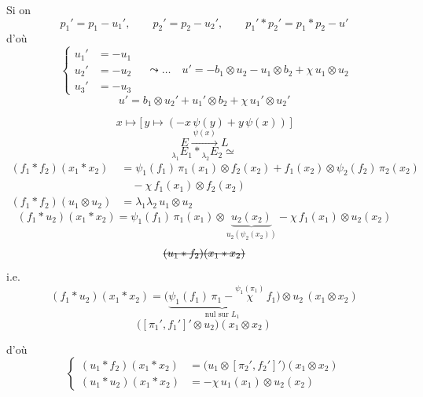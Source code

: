 \documentclass[11pt,a4paper]{article}
\begin{document}
Si on 
\[
  p_1' = p_1 - u_1', \qquad p_2' = p_2 - u_2', \qquad p_1' * p_2' = p_1 * p_2 - u'
\]
d'où
\[
  \left\{
  \begin{aligned}
    u_1' &= -u_1 \\ u_2' &= -u_2 \\ u_3' &= -u_3
  \end{aligned}
  \right.
  \quad\leadsto\ldots\quad
  u' = -b_1 \otimes u_2 - u_1 \otimes b_2 + \chi\, u_1 \otimes u_2
\]
\[
  \boxed{u' = b_1 \otimes u_2' + u_1' \otimes b_2 + \chi\, u_1' \otimes u_2'}
\]



\[
  x \longmapsto \bigl[\, y \longmapsto (-x\,\psi(y) + y\,\psi(x)) \,\bigr]
\]
\[
  E \xrightarrow{\ \psi(x)\ } L
\]
\[
  {}_{\lambda_1}E_1 * {}_{\lambda_2}E_2 \simeq
\]
\[
  \boxed{
  \begin{aligned}
    (f_1 * f_2)(x_1 * x_2) &= \psi_1(f_1)\,\pi_1(x_1) \otimes f_2(x_2)
    + f_1(x_2) \otimes \psi_2(f_2)\,\pi_2(x_2) \\
    &\quad - \chi\, f_1(x_1) \otimes f_2(x_2) \\
    (f_1 * f_2)(u_1 \otimes u_2) &= \lambda_1\lambda_2\, u_1 \otimes u_2
  \end{aligned}}
\]
\[
  (f_1 * u_2)(x_1 * x_2) = \psi_1(f_1)\,\pi_1(x_1) \otimes \underbrace{u_2(x_2)}_{u_2(\psi_2(x_2))}
  - \chi\, f_1(x_1) \otimes u_2(x_2)
\]
\[
  \text{\struck{$(u_1 * f_2)(x_1 * x_2)$}}
\]
i.e.
\[
  (f_1 * u_2)(x_1 * x_2) = \bigl(\underbrace{\psi_1(f_1)\,\pi_1 - \overset{\psi_1(\pi_1)}{\chi}\, f_1}_{\text{nul sur } L_1}\bigr) \otimes u_2\,(x_1 \otimes x_2)
\]
\[
  \bigl( [\pi_1', f_1']' \otimes u_2 \bigr)(x_1 \otimes x_2)
\]

d'où
\[
  \left\{
  \begin{aligned}
    (u_1 * f_2)(x_1 * x_2) &= \bigl(u_1 \otimes [\pi_2', f_2']'\bigr)(x_1 \otimes x_2) \\
    (u_1 * u_2)(x_1 * x_2) &= -\chi\, u_1(x_1) \otimes u_2(x_2)
  \end{aligned}
  \right.
\]
\end{document}

